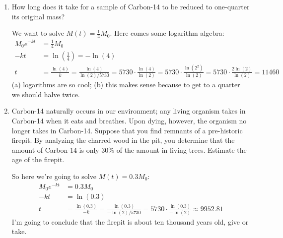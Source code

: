 \begin{enumerate}[leftmargin=0pt]
\begin{enumerate}
    \begin{red}
    From this information I know that $M(5730) = \frac12 M_0$. Therefore,
    \begin{align*}
        M_0e^{-k\cdot5730} &= \frac12 M_0 \\
        -k\cdot5730 &= \ln\left(\frac12\right) = -\ln(2) \\
        k &= \frac{\ln(2)}{5730}
    \end{align*}
    (So: in general, for a radioisotope with a half-life of $h$ years, the value of $k$ works out to be $\tfrac{\ln(2)}{h}$.)
    \end{red}
    \item How long does it take for a sample of Carbon-14 to be reduced to one-quarter its original mass?
    
    \begin{red}
    We want to solve $M(t) = \frac14 M_0$. Here comes some logarithm algebra:
    \begin{align*}
        M_0 e^{-kt} &= \frac14 M_0 \\
        -kt &= \ln\left(\frac14\right) = -\ln(4) \\
        t &= \frac{\ln(4)}{k} = \frac{\ln(4)}{\ln(2) / 5730} 
        = 5730\cdot \frac{\ln(4)}{\ln(2)} 
        = 5730\cdot \frac{\ln(2^2)}{\ln(2)} 
        = 5730\cdot \frac{2\ln(2)}{\ln(2)} 
        = 11460
    \end{align*}
    (a) logarithms are so cool; (b) this makes sense because to get to a quarter we should halve twice.
    \end{red}
    \item Carbon-14 naturally occurs in our environment; any living organism takes in Carbon-14 when it eats and breathes. Upon dying, however, the organism no longer takes in Carbon-14. Suppose that you find remnants of a pre-historic firepit. By analyzing the charred wood in the pit, you determine that the amount of Carbon-14 is only 30\% of the amount in living trees. Estimate the age of the firepit.
    
    \begin{red}
    So here we're going to solve $M(t) = 0.3M_0$:
    \begin{align*}
        M_0 e^{-kt} &= 0.3 M_0 \\
        -kt &= \ln(0.3) \\
        t &= \frac{\ln(0.3)}{-k} = \frac{\ln(0.3)}{-\ln(2)/5730} = 5730\cdot \frac{\ln(0.3)}{-\ln(2)} \approx 9952.81
    \end{align*}
    I'm going to conclude that the firepit is about ten thousand years old, give or take.
    \end{red}
\end{enumerate}


\end{enumerate}
